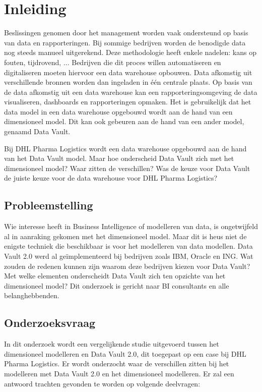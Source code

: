 
\chapter{Inleiding}
\label{ch:inleiding}
Beslissingen genomen door het management worden vaak ondersteund op basis van data en rapporteringen. Bij sommige bedrijven worden de benodigde data nog steeds manueel uitgerekend. Deze methodologie heeft enkele nadelen: kans op fouten, tijdrovend, ... Bedrijven die dit proces willen automatiseren en digitaliseren moeten hiervoor een data warehouse opbouwen. Data afkomstig uit verschillende bronnen worden dan ingeladen in één centrale plaats. Op basis van de data afkomstig uit een data warehouse kan een rapporteringsomgeving de data visualiseren, dashboards en rapporteringen opmaken. Het is gebruikelijk dat het data model in een data warehouse opgebouwd wordt aan de hand van een dimensioneel model. Dit kan ook gebeuren aan de hand van een ander model, genaamd Data Vault. 

Bij DHL Pharma Logistics wordt een data warehouse opgebouwd aan de hand van het Data Vault model. Maar hoe onderscheid Data Vault zich met het dimensioneel model? Waar zitten de verschillen? Was de keuze voor Data Vault de juiste keuze voor de data warehouse voor DHL Pharma Logistics?



\section{Probleemstelling}
\label{sec:probleemstelling}

Wie interesse heeft in Business Intelligence of modelleren van data, is ongetwijfeld al in aanraking gekomen met het dimensioneel model. Maar dit is heus niet de enigste techniek die beschikbaar is voor het modelleren van data modellen. Data Vault 2.0 werd al geïmplementeerd bij bedrijven zoals IBM, Oracle en ING. Wat zouden de redenen kunnen zijn waarom deze bedrijven kiezen voor Data Vault? Met welke elementen onderscheidt Data Vault zich ten opzichte van het dimensioneel model? Dit onderzoek is gericht naar BI consultants en alle belanghebbenden.

\section{Onderzoeksvraag}
\label{sec:onderzoeksvraag}
In dit onderzoek wordt een vergelijkende studie uitgevoerd tussen het dimensioneel modelleren en Data Vault 2.0, dit toegepast op een case bij DHL Pharma Logistics. Er wordt onderzocht waar de verschillen zitten bij het modelleren met Data Vault 2.0 en het dimensioneel modelleren. Er zal een antwoord trachten gevonden te worden op volgende deelvragen:

